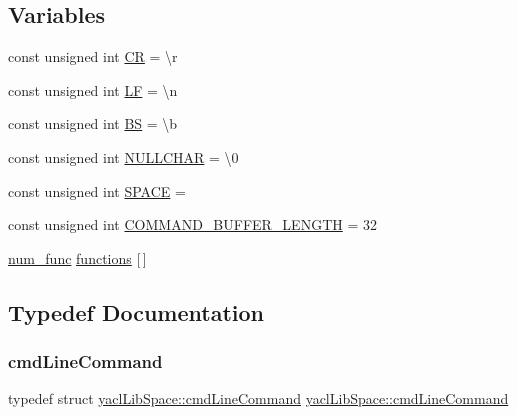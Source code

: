 \subsection*{Variables}
\begin{DoxyCompactItemize}
\item 
const unsigned int \mbox{\hyperlink{namespaceyacl_lib_space_a3154f4ed62be05fbb5787f4d7b634290}{CR}} = \textquotesingle{}\textbackslash{}r\textquotesingle{}
\item 
const unsigned int \mbox{\hyperlink{namespaceyacl_lib_space_af217cce1c019bd97c9cd68593afd95ec}{LF}} = \textquotesingle{}\textbackslash{}n\textquotesingle{}
\item 
const unsigned int \mbox{\hyperlink{namespaceyacl_lib_space_a62ce8ed70ded697194ee4b7a02662780}{BS}} = \textquotesingle{}\textbackslash{}b\textquotesingle{}
\item 
const unsigned int \mbox{\hyperlink{namespaceyacl_lib_space_a81dbb2c841809ac283b00765b06d5478}{N\+U\+L\+L\+C\+H\+AR}} = \textquotesingle{}\textbackslash{}0\textquotesingle{}
\item 
const unsigned int \mbox{\hyperlink{namespaceyacl_lib_space_aa99e7f43feaee14d5285a92dd98baf0e}{S\+P\+A\+CE}} = \textquotesingle{} \textquotesingle{}
\item 
const unsigned int \mbox{\hyperlink{namespaceyacl_lib_space_a3247d520bbfd9b82183519c563e54ef3}{C\+O\+M\+M\+A\+N\+D\+\_\+\+B\+U\+F\+F\+E\+R\+\_\+\+L\+E\+N\+G\+TH}} = 32
\item 
\mbox{\hyperlink{namespaceyacl_lib_space_abe18da2116a229caa63a12870966ac35}{num\+\_\+func}} \mbox{\hyperlink{namespaceyacl_lib_space_a64124c11acabe62bf81253c05e59b0bc}{functions}} \mbox{[}$\,$\mbox{]}
\end{DoxyCompactItemize}


\subsection{Typedef Documentation}
\mbox{\label{namespaceyacl_lib_space_a07daa105cee1dad270e270163e5278f9}} 
\subsubsection{\texorpdfstring{cmdLineCommand}{cmdLineCommand}}
{\footnotesize\ttfamily typedef struct \mbox{\hyperlink{structyacl_lib_space_1_1cmd_line_command}{yacl\+Lib\+Space\+::cmd\+Line\+Command}}  \mbox{\hyperlink{structyacl_lib_space_1_1cmd_line_command}{yacl\+Lib\+Space\+::cmd\+Line\+Command}}}

